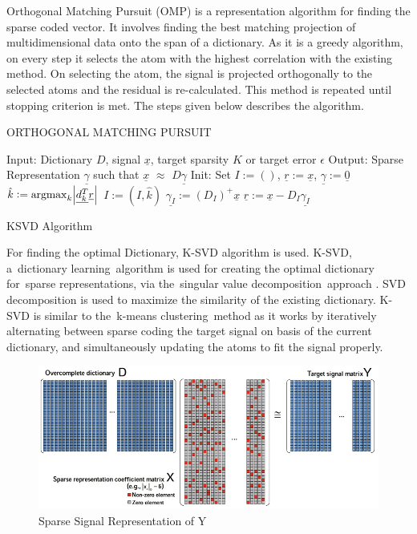 \documentclass[a4paper, 15pt]{article}
\DeclareMathOperator*{\argmax}{argmax}
\begin{document}
	\par
	Orthogonal Matching Pursuit (OMP) is a representation algorithm for finding the sparse coded vector. It involves finding the best matching projection of multidimensional data onto the span of a dictionary. As it is a greedy algorithm, on every step it selects the atom with the highest correlation with the existing method. On selecting the atom, the signal is projected orthogonally to the selected atoms and the residual is re-calculated. This method is repeated until stopping criterion is met. The steps given below describes the algorithm. 
	\par

	\begin{algorithm}
		\caption{ORTHOGONAL MATCHING PURSUIT}
		\begin{algorithmic}[1]
			\State Input: Dictionary $D$, signal $\underline{x}$, target sparsity $K$ or target error $\epsilon$	
			\State Output: Sparse Representation $\underline{\gamma}$ such that $\underline{x}$ $\approx$ $D\underline{\gamma}$
			\State Init: Set $I := ()$, $\underline{r} := \underline{x}$, $\underline{\gamma} := \underline{0}$
				\State	$\hat{k} := \argmax_{k}{\abs{\underline{d^{T}_{k}} \underline{r}}} $
				\State $I := (I, \hat{k})$
				\State $\underline{\gamma_{I}} := (D_{I})^{+}\underline{x} $
				\State $\underline{r} := \underline{x} - D_{I}\underline{\gamma_{I}} $
			\EndWhile
		\end{algorithmic}
	\end{algorithm}
	\newpage
	\begin{center}
		{\fontsize{20}{30}\selectfont KSVD Algorithm}\
	\end{center}
	\par
	For finding the optimal Dictionary, K-SVD algorithm is used. K-SVD, a dictionary learning algorithm is used for creating the optimal dictionary for sparse representations, via the singular value decomposition approach \cite{1}. SVD decomposition is used to maximize the similarity of the existing dictionary. K-SVD is similar to the k-means clustering method as it works by iteratively alternating between sparse coding the target signal on basis of the current dictionary, and simultaneously updating the atoms to fit the signal properly.
	\par
	\begin{figure}[h]
		\centering
		\includegraphics[scale=0.6]{svd.png}
		\caption{Sparse Signal Representation of Y}
		\label{fig:svd}
	\end{figure}
\end{document}
